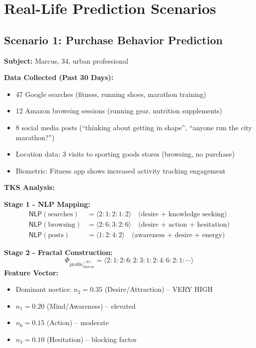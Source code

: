 \documentclass[11pt,twoside]{book}
\newcommand{\NLP}{\mathsf{NLP}}
\newcommand{\ProfileFrac}{\Phi_{\mathrm{profile}}}
\begin{document}
\part{Real-Life Prediction Scenarios}

\chapter{Scenario 1: Purchase Behavior Prediction}
\label{ch:scenario-purchase}

\begin{tcolorbox}[colback=yellow!5!white,colframe=yellow!65!black,title=\textbf{Scenario: Predicting Marcus's Next Purchase},breakable]

\textbf{Subject:} Marcus, 34, urban professional

\textbf{Data Collected (Past 30 Days):}
\begin{itemize}
    \item 47 Google searches (fitness, running shoes, marathon training)
    \item 12 Amazon browsing sessions (running gear, nutrition supplements)
    \item 8 social media posts (``thinking about getting in shape'', ``anyone run the city marathon?'')
    \item Location data: 3 visits to sporting goods stores (browsing, no purchase)
    \item Biometric: Fitness app shows increased activity tracking engagement
\end{itemize}

\textbf{TKS Analysis:}

\textbf{Stage 1 - NLP Mapping:}
\begin{align*}
    \NLP(\text{searches}) &= \langle 2:1:2:1:2 \rangle \quad \text{(desire + knowledge seeking)} \\
    \NLP(\text{browsing}) &= \langle 2:6:3:2:6 \rangle \quad \text{(desire + action + hesitation)} \\
    \NLP(\text{posts}) &= \langle 1:2:4:2 \rangle \quad \text{(awareness + desire + energy)}
\end{align*}

\textbf{Stage 2 - Fractal Construction:}
\[
    \ProfileFrac_{\text{Marcus}}^{(30)} = \langle 2:1:2:6:2:3:1:2:4:6:2:1:\cdots \rangle
\]
\textbf{Feature Vector:}
\begin{itemize}
    \item Dominant noetics: $n_2 = 0.35$ (Desire/Attraction) -- VERY HIGH
    \item $n_1 = 0.20$ (Mind/Awareness) -- elevated
    \item $n_6 = 0.15$ (Action) -- moderate
    \item $n_3 = 0.10$ (Hesitation) -- blocking factor
\end{itemize}


\end{tcolorbox}
\end{document}
